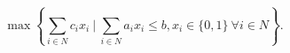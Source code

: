 \[ \max \left\{ \sum_{i \in N} c_i x_i \ | \ \sum_{i \in N} a_i x_i \leq b, x_i \in \{0,1\} \ \forall i \in N \right\}. \]